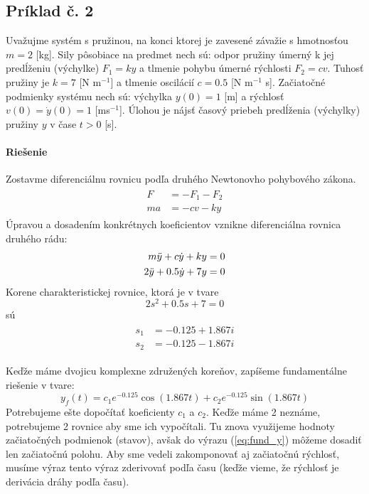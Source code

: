 \documentclass[a4paper, 10pt, ]{article}
\begin{document}
\subsection{Príklad č. 2}

Uvažujme systém s pružinou, na konci ktorej je zavesené závažie s hmotnosťou $m=2$ [kg]. Sily pôsobiace na predmet nech sú: odpor pružiny úmerný k jej predĺženiu (výchylke) $F_1= k y$ a tlmenie pohybu úmerné rýchlosti $F_2 = c v$. Tuhosť pružiny je $k=7$ [N m$^{-1}$] a tlmenie oscilácií $c=0.5$ [N  m$^{-1}$ s]. Začiatočné podmienky systému nech sú: výchylka $y(0) = 1$ [m] a rýchlosť $v(0)=\dot{y}(0) = 1$ [ms$^{-1}$]. Úlohou je nájsť časový priebeh predĺženia (výchylky) pružiny $y$ v čase $t>0$ [s].

\paragraph{Riešenie}

Zostavme diferenciálnu rovnicu podľa druhého Newtonovho pohybového zákona.
\begin{align}
\begin{split}
    F &= - F_1 - F_2 \\
    ma &= -cv - ky 
\end{split}
\end{align}
Úpravou a dosadením konkrétnych koeficientov vznikne diferenciálna rovnica druhého rádu:
\begin{align}
\begin{split}
    m \Ddot{y} + c\Dot{y} + ky &= 0 \\
    2 \Ddot{y} + 0.5\Dot{y} + 7y &= 0
\end{split}
\end{align}
Korene charakteristickej rovnice, ktorá je v tvare
\begin{equation}
    2s^2 + 0.5s + 7 = 0
\end{equation}
sú
\begin{align}
    \begin{split}
        s_{1} &= -0.125 + 1.867i \\
        s_{2} &= -0.125 - 1.867i
    \end{split}
\end{align}


Keďže máme dvojicu komplexne združených koreňov, zapíšeme fundamentálne riešenie v tvare:
\begin{equation}\label{eq:fund_y}
    y_f(t) = c_{1}e^{-0.125}\cos{(1.867t)} + c_{2}e^{-0.125}\sin{(1.867t)}
\end{equation}
Potrebujeme ešte dopočítať koeficienty $c_1$ a $c_2$. Keďže máme 2 neznáme, potrebujeme 2 rovnice aby sme ich vypočítali. Tu znova využijeme hodnoty začiatočných podmienok (stavov), avšak do výrazu (\ref{eq:fund_y}) môžeme dosadiť len začiatočnú polohu. Aby sme vedeli zakomponovať aj začiatočnú rýchlosť, musíme výraz tento výraz zderivovať podľa času (keďže vieme, že rýchlosť je derivácia dráhy podľa času).
\end{document}
